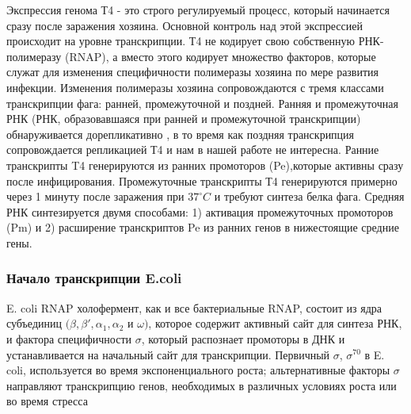 \documentclass[14pt]{extarticle}
\begin{document}
        \par{Экспрессия генома Т4 - это строго регулируемый процесс, который начинается сразу после заражения хозяина. 
        Основной контроль над этой экспрессией происходит на уровне транскрипции. Т4 не кодирует свою собственную 
        РНК-полимеразу (RNAP), а вместо этого кодирует множество факторов, которые служат для изменения специфичности 
        полимеразы хозяина по мере развития инфекции. Изменения полимеразы хозяина сопровождаются с тремя классами 
        транскрипции фага: ранней, промежуточной и поздней. Ранняя и промежуточная РНК (РНК, образовавшаяся при ранней и
        промежуточной транскрипции) обнаруживается дорепликативно 
        \cite{hinton1,hinton2,hinton3,hinton4,hinton5,hinton6}, в то время как поздняя транскрипция сопровождается 
        репликацией Т4 и нам в нашей работе не интересна. Ранние транскрипты T4 генерируются из ранних промоторов 
        (Pe),которые активны сразу после инфицирования. Промежуточные транскрипты Т4 генерируются примерно через 1 
        минуту после заражения при \(37^\circ C\) и требуют синтеза белка фага. Средняя РНК синтезируется двумя 
        способами: 1) активация промежуточных промоторов (Pm) и 2) расширение транскриптов Pe из ранних генов в 
        нижестоящие средние гены.}
        
        \begin{center}
        \item \subsubsection {Начало транскрипции E.coli}
        \end{center}
        
        \par{E. coli RNAP холофермент, как и все бактериальные RNAP, состоит из ядра субъединиц 
        \((\beta,\beta',\alpha_1,\alpha_2\) и \(\omega)\), которое содержит активный сайт для синтеза РНК, и фактора 
        специфичности \(\sigma\), который распознает промоторы в ДНК и устанавливается на начальный сайт для 
        транскрипции. Первичный \(\sigma\), \(\sigma^{70}\) в E. coli, используется во время экспоненциального роста; 
        альтернативные факторы \(\sigma\) направляют транскрипцию генов, необходимых в различных условиях роста или во 
        время стресса \cite{17,18,19}}
        
\end{document}
